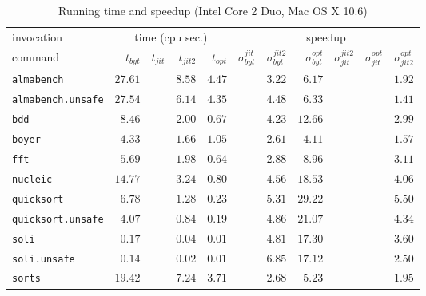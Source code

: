 \documentclass[12pt,a4paper,final]{article}
\begin{document}
\begin{table*}[h]
  \footnotesize
  \centering
  \begin{tabular}{l|rrrr|rrrrrr}
    \multicolumn{1}{l|}{\large invocation}
    & \multicolumn{4}{c|}{{\large time} (cpu sec.)}
    & \multicolumn{6}{c}{\large speedup}
    \\
    command
    & $t_{byt}$ & $t_{jit}$ & $t_{jit2}$ & $t_{opt}$
    & $\sigma^{jit}_{byt}$ & $\sigma^{jit2}_{byt}$ & $\sigma^{opt}_{byt}$
    & $\sigma^{jit2}_{jit}$ & $\sigma^{opt}_{jit}$ & $\sigma^{opt}_{jit2}$
    \\
    \hline
    \texttt{almabench} & $27.61$ & & $8.58$ & $4.47$ &  & $3.22$ & $6.17$ &  &  & $1.92$\\
    \texttt{almabench.unsafe} & $27.54$ &  & $6.14$ & $4.35$ &  & $4.48$ & $6.33$ &  &  & $1.41$\\
    \texttt{bdd} & $8.46$ &  & $2.00$ & $0.67$ &  & $4.23$ & $12.66$ &  &  & $2.99$\\
    \texttt{boyer} & $4.33$ &  & $1.66$ & $1.05$ &  & $2.61$ & $4.11$ &  &  & $1.57$\\
    \texttt{fft} & $5.69$ &  & $1.98$ & $0.64$ &  & $2.88$ & $8.96$ &  &  & $3.11$\\
    \texttt{nucleic} & $14.77$ &  & $3.24$ & $0.80$ &  & $4.56$ & $18.53$ &  &  & $4.06$\\
    \texttt{quicksort} & $6.78$ &  & $1.28$ & $0.23$ &  & $5.31$ & $29.22$ &  &  & $5.50$\\
    \texttt{quicksort.unsafe} & $4.07$ &  & $0.84$ & $0.19$ &  & $4.86$ & $21.07$ &  &  & $4.34$\\
    \texttt{soli} & $0.17$ &  & $0.04$ & $0.01$ &  & $4.81$ & $17.30$ &  &  & $3.60$\\
    \texttt{soli.unsafe} & $0.14$ &  & $0.02$ & $0.01$ &  & $6.85$ & $17.12$ &  &  & $2.50$\\
    \texttt{sorts} & $19.42$ &  & $7.24$ & $3.71$ &  & $2.68$ & $5.23$ &  &  & $1.95$\\
  \end{tabular}
  \caption{Running time and speedup (Intel Core 2 Duo, Mac OS X 10.6)}
  \label{table:Running_time_and_speedup_Intel_Core_2_Duo}
\end{table*}
\end{document}
